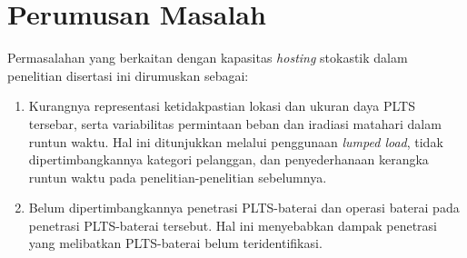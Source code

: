 

\section{Perumusan Masalah}
Permasalahan yang berkaitan dengan kapasitas \textit{hosting} stokastik dalam penelitian disertasi ini dirumuskan sebagai:
\begin{enumerate}
    \item Kurangnya representasi ketidakpastian lokasi dan ukuran daya PLTS tersebar, serta variabilitas permintaan beban dan iradiasi matahari dalam runtun waktu. Hal ini ditunjukkan melalui penggunaan \textit{lumped load}, tidak dipertimbangkannya kategori pelanggan, dan penyederhanaan kerangka runtun waktu pada penelitian-penelitian sebelumnya.
    \item Belum dipertimbangkannya penetrasi PLTS-baterai dan operasi baterai pada penetrasi PLTS-baterai tersebut. Hal ini menyebabkan dampak penetrasi yang melibatkan PLTS-baterai belum teridentifikasi.
\end{enumerate}

